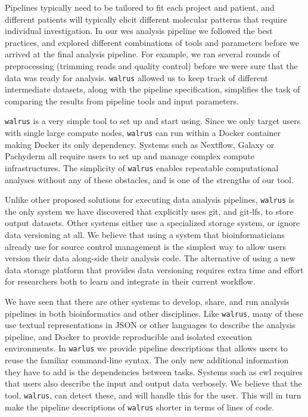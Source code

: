 Pipelines typically need to be tailored to fit each project and patient, and
different patients will typically elicit different molecular patterns that
require individual investigation.  In our \gls{wes} analysis pipeline we
followed the best practices, and explored different combinations of tools and
parameters before we arrived at the final analysis pipeline. For example, we ran
several rounds of preprocessing (trimming reads and quality control) before we
were sure that the data was ready for analysis. \texttt{walrus} allowed us to
keep track of different intermediate datasets, along with the pipeline
specification, simplifies the task of comparing the results from pipeline tools
and input parameters. 

\texttt{walrus} is a very simple tool to set up and start using. Since we only
target users with single large compute nodes, \texttt{walrus} can run within a
Docker container making Docker its only dependency. Systems such as Nextflow,
Galaxy or Pachyderm all require users to set up and manage complex compute
infrastructures. The simplicity of \texttt{walrus} enables repeatable
computational analyses without any of these obstacles, and is one of the
strengths of our tool. 

Unlike other proposed solutions for executing data analysis pipelines,
\texttt{walrus} is the only system we have discovered that explicitly uses git,
and git-lfs, to store output datasets. Other systems either use a specialized
storage system, or ignore data versioning at all. We believe that using a system
that bioinformaticians already use for source control management is the simplest
way to allow users version their data along-side their analysis code. The
alternative of using a new data storage platform that provides data versioning
requires extra time and effort for researchers both to learn and integrate in
their current workflow. 

We have seen that there are other systems to develop, share, and run
analysis pipelines in both bioinformatics and other disciplines. Like
\texttt{walrus}, many of these use textual representations in JSON or other
languages to describe the analysis pipeline, and Docker to provide reproducible
and isolated execution environments. In \texttt{warlus} we provide pipeline
descriptions that allows users to reuse the familiar command-line syntax. The
only new additional information they have to add is the dependencies between
tasks. Systems such as \gls{cwl} requires that users also describe the input and
output data verbosely. We believe that the tool, \texttt{walrus}, can detect
these, and will handle this for the user. This will in turn make the pipeline
descriptions of \texttt{walrus} shorter in terms of lines of code.  

